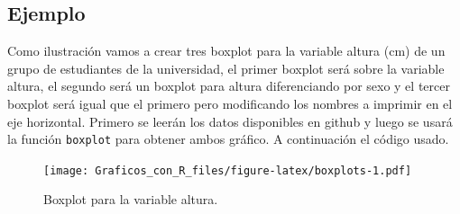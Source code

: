 \documentclass[10pt,]{krantz}
\makeatletter
\newenvironment{Shaded}{\begin{snugshade}}{\end{snugshade}}
\newcommand{\KeywordTok}[1]{\textcolor[rgb]{0.13,0.29,0.53}{\textbf{{#1}}}}
\newcommand{\DataTypeTok}[1]{\textcolor[rgb]{0.13,0.29,0.53}{{#1}}}
\newcommand{\DecValTok}[1]{\textcolor[rgb]{0.00,0.00,0.81}{{#1}}}
\newcommand{\StringTok}[1]{\textcolor[rgb]{0.31,0.60,0.02}{{#1}}}
\newcommand{\OtherTok}[1]{\textcolor[rgb]{0.56,0.35,0.01}{{#1}}}
\newcommand{\NormalTok}[1]{{#1}}
\newenvironment{kframe}{%
\medskip{}
\setlength{\fboxsep}{.8em}
 \def\at@end@of@kframe{}%
 \ifinner\ifhmode%
  \def\at@end@of@kframe{\end{minipage}}%
  \begin{minipage}{\columnwidth}%
 \fi\fi%
 \def\FrameCommand##1{\hskip\@totalleftmargin \hskip-\fboxsep
 \colorbox{shadecolor}{##1}\hskip-\fboxsep
     \hskip-\linewidth \hskip-\@totalleftmargin \hskip\columnwidth}%
 \MakeFramed {\advance\hsize-\width
   \@totalleftmargin\z@ \linewidth\hsize
   \@setminipage}}%
 {\par\unskip\endMakeFramed%
 \at@end@of@kframe}
\renewenvironment{Shaded}{\begin{kframe}}{\end{kframe}}
\makeatother
\begin{document}
\subsection*{Ejemplo}\label{ejemplo-1}


Como ilustración vamos a crear tres boxplot para la variable altura (cm)
de un grupo de estudiantes de la universidad, el primer boxplot será
sobre la variable altura, el segundo será un boxplot para altura
diferenciando por sexo y el tercer boxplot será igual que el primero
pero modificando los nombres a imprimir en el eje horizontal. Primero se
leerán los datos disponibles en github y luego se usará la función
\texttt{boxplot} para obtener ambos gráfico. A continuación el código
usado.

\begin{Shaded}
\end{Shaded}

\begin{figure}[htbp]
\centering
\texttt{[image: Graficos\_con\_R\_files/figure-latex/boxplots-1.pdf]}
\caption{\label{fig:boxplots}Boxplot para la variable altura.}
\end{figure}
\end{document}
